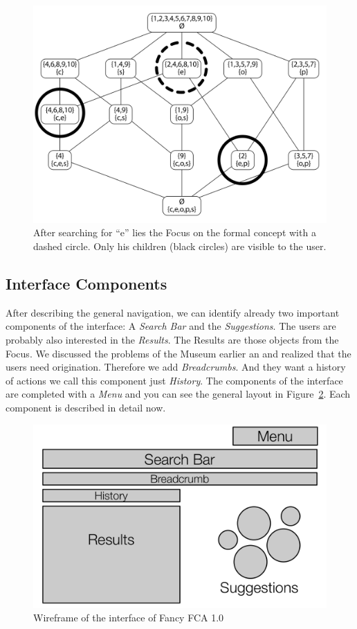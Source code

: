 \documentclass[11pt]{report}
\begin{document}
\begin{figure}[!ht]
	\centering
	\includegraphics[width=\linewidth]{images/focus}
\caption{After searching for ``e'' lies the Focus on the formal concept with a dashed circle. Only his children (black circles) are visible to the user. }
\label{figure:conceptExample}
\end{figure}

\subsection{Interface Components}
After describing the general navigation, we can identify already two important components of the interface: A \textit{Search Bar} and the \textit{Suggestions}. The users are probably also interested in the \textit{Results}. The Results are those objects from the Focus. We discussed the problems of the Museum earlier an and realized that the users need origination. Therefore we add \textit{Breadcrumbs}. And they want a history of actions we call this component just \textit{History}. The components of the interface are completed with a \textit{Menu} and you can see the general layout in Figure~\ref{figure:schema}. Each component is described in detail now. \\

\begin{figure}[!ht]
	\centering
	\includegraphics[width=\linewidth]{images/schema}
\caption{Wireframe of the interface of Fancy FCA 1.0}
\label{figure:schema}
\end{figure}
\end{document}
